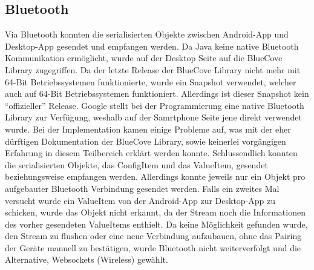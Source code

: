 \subsection{Bluetooth}
Via Bluetooth konnten die serialisierten Objekte zwischen Android-App 
und Desktop-App gesendet und empfangen werden. 
Da Java keine native Bluetooth Kommunikation ermöglicht, wurde auf der 
Desktop Seite auf die BlueCove Library zugegriffen. Da der letzte Release der 
BlueCove Library nicht mehr mit 64-Bit Betriebssystemen funktionierte, wurde ein Snapshot 
verwendet, welcher auch auf 64-Bit Betriebssystemen funktioniert. Allerdings ist dieser Snapshot 
kein \enquote{offizieller} Release. \newline
Google stellt bei der Programmierung eine native Bluetooth 
Library zur Verfügung, weshalb auf der Samrtphone Seite jene direkt verwendet wurde. 
Bei der Implementation kamen einige Probleme auf, was mit der eher dürftigen 
Dokumentation der BlueCove Library, sowie keinerlei vorgängigen Erfahrung in diesem Teilbereich 
erklärt werden konnte. Schlussendlich konnten die serialisierten Objekte, das ConfigItem 
und das ValueItem, gesendet beziehungsweise empfangen werden.
Allerdings konnte jeweils nur ein Objekt pro aufgebauter 
Bluetooth Verbindung gesendet werden. Falls ein zweites Mal versucht wurde ein ValueItem von der 
Android-App zur Desktop-App zu schicken, wurde das Objekt nicht erkannt, da der 
Stream noch die Informationen des vorher gesendeten ValueItems enthielt. 
Da keine Möglichkeit gefunden wurde, den Stream zu flushen oder eine neue 
Verbindung aufzubauen, ohne das Pairing der Geräte manuell zu bestätigen, wurde Bluetooth 
nicht weiterverfolgt und die Alternative, Websockets (Wireless) gewählt. 

            
